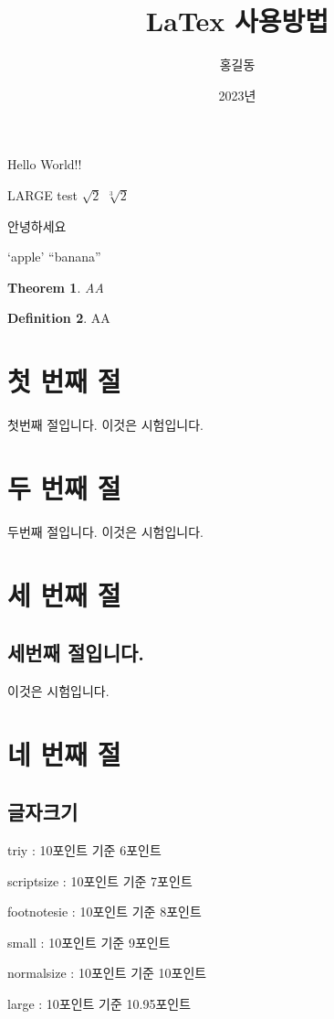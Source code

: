 \documentclass[12pt,a4paper,twoside, footnote]{oblivoir}
\title{LaTex 사용방법}
\author{홍길동}
\date{2023년}
\theoremstyle{plain}
\newtheorem{theorem}{Theorem}[section]
\theoremstyle{definition}
\newtheorem{definition}[theorem]{Definition}
\theoremstyle{remark}
\begin{document}
\maketitle
Hello World!!
\begin{center}
\LARGE LARGE test
$\sqrt{2}$
$\sqrt[3]{2}$

안녕하세요

`apple'
``banana''

\begin{theorem}
    AA
\end{theorem}

\begin{definition}
    AA
\end{definition}

\section[목차에 표시되는 내용입니다.]{첫 번째 절}
첫번째 절입니다.
이것은 시험입니다.

\section*{두 번째 절}
두번째 절입니다.
이것은 시험입니다.

\section{세 번째 절}
\subsection{세번째 절입니다.}
이것은 시험입니다.

\section{네 번째 절}
\subsection{글자크기}
{\tiny triy : 10포인트} 기준 6포인트

\scriptsize scriptsize : 10포인트 기준 7포인트

\footnotesize footnotesie : 10포인트 기준 8포인트

\small small : 10포인트 기준 9포인트

\normalsize normalsize : 10포인트 기준 10포인트

\large large : 10포인트 기준 10.95포인트


\end{center}
\end{document}
